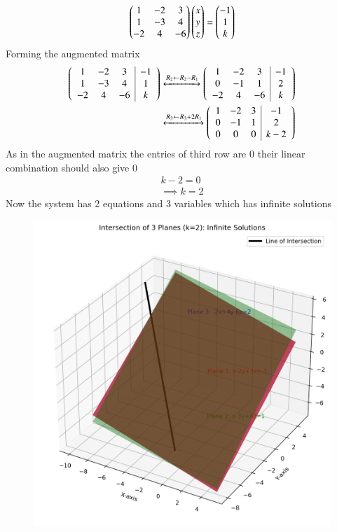 \documentclass[journal]{IEEEtran}
\begin{document}
\begin{align}
    \begin{pmatrix}
        1 & -2 & 3\\
        1 & -3 & 4\\
        -2 & 4 & -6
    \end{pmatrix}\begin{pmatrix}x\\y\\z\end{pmatrix}=\begin{pmatrix}-1\\1\\k\end{pmatrix}
\end{align}
Forming the augmented matrix
\begin{align}
    \left(\begin{array}{ccc|c}
        1 & -2 & 3 & -1 \\
        1 & -3 & 4 & 1\\
        -2 & 4 & -6 & k\\
\end{array}\right) &\xleftrightarrow{R_2 \leftarrow R_2 -  R_1} \left(\begin{array}{ccc|c}
        1 & -2 & 3 & -1 \\
        0 & -1 & 1 & 2\\
        -2 & 4 & -6 & k\\
\end{array}\right)\\
&\xleftrightarrow{R_3 \leftarrow R_3 +  2R_1} \left(\begin{array}{ccc|c}
        1 & -2 & 3 & -1 \\
        0 & -1 & 1 & 2\\
        0 & 0 & 0 & k-2\\
\end{array}\right)
\end{align}
As in the augmented matrix the entries of third  row are 0 their linear combination should also give 0 
\begin{align}
    k-2=0\\
    \implies k=2
\end{align}
Now the system has 2 equations and 3 variables which has infinite solutions
\begin{figure}[h!]
    \centering
    \includegraphics[width=0.74\columnwidth]{figs/01.png}
    \caption{}
    \label{fig:placeholder}
\end{figure}
\end{document}
